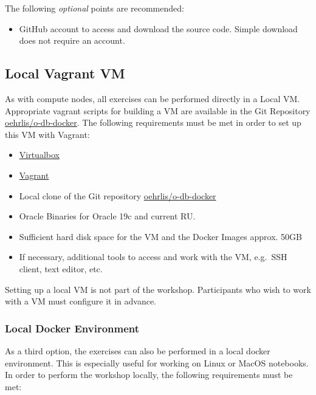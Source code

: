 The following \emph{optional} points are recommended:

\begin{itemize}
\tightlist
\item
  GitHub account to access and download the source code. Simple download
  does not require an account.
\end{itemize}

\hypertarget{local-vagrant-vm}{%
\subsection{Local Vagrant VM}\label{local-vagrant-vm}}

As with compute nodes, all exercises can be performed directly in a
Local VM. Appropriate vagrant scripts for building a VM are available in
the Git Repository
\href{https://github.com/oehrlis/o-db-docker}{oehrlis/o-db-docker}. The
following requirements must be met in order to set up this VM with
Vagrant:

\begin{itemize}
\tightlist
\item
  \href{https://www.virtualbox.org/wiki/Downloads}{Virtualbox}
\item
  \href{https://www.vagrantup.com}{Vagrant}
\item
  Local clone of the Git repository
  \href{https://github.com/oehrlis/o-db-docker}{oehrlis/o-db-docker}
\item
  Oracle Binaries for Oracle 19c and current RU.
\item
  Sufficient hard disk space for the VM and the Docker Images approx.
  50GB
\item
  If necessary, additional tools to access and work with the VM,
  e.g.~SSH client, text editor, etc.
\end{itemize}

Setting up a local VM is not part of the workshop. Participants who wish
to work with a VM must configure it in advance.

\hypertarget{local-docker-environment}{%
\subsubsection{Local Docker
Environment}\label{local-docker-environment}}

As a third option, the exercises can also be performed in a local docker
environment. This is especially useful for working on Linux or MacOS
notebooks. In order to perform the workshop locally, the following
requirements must be met:

